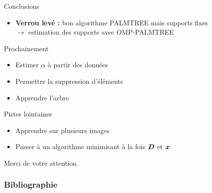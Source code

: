 \begin{frame}{Conclusions}

\begin{itemize}
\item[\cmark] \textbf{Verrou levé :} bon algorithme PALMTREE mais supports \alert{fixes} \\
	$\rightarrow$ \alert{estimation} des supports avec OMP-PALMTREE

\end{itemize}
Prochainement
\begin{itemize}
\item Estimer $\alpha$ à partir des données
\item Permettre la suppression d'éléments
\item Apprendre l'arbre

\end{itemize}
Pistes lointaines
\begin{itemize}
\item[\textcolor{purple}{\ding{43}}] Apprendre sur plusieurs images
\item[\textcolor{purple}{\ding{43}}] Passer à un algorithme minimisant à la fois $\bm{D}$ et $\bm{x}$
\end{itemize}
\vfill
\hfill Merci de votre attention
\end{frame}

\appendix

\backupbegin
\begin{frame}[allowframebreaks]
\frametitle{Bibliographie}
\printbibliography[heading=none]
\end{frame}
\backupend


